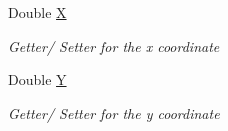 \begin{DoxyCompactItemize}
Double \hyperlink{class_web_analyzer_1_1_models_1_1_base_1_1_raw_tracking_event_ab5a8776cb0eb8f3d4cc89a25f3a16495}{X}
\begin{DoxyCompactList}\small\item\em Getter/ Setter for the x coordinate \end{DoxyCompactList}\item 
Double \hyperlink{class_web_analyzer_1_1_models_1_1_base_1_1_raw_tracking_event_afda6b7de37da6ad8950ecf5608e25dab}{Y}
\begin{DoxyCompactList}\small\item\em Getter/ Setter for the y coordinate \end{DoxyCompactList}\end{DoxyCompactItemize}
